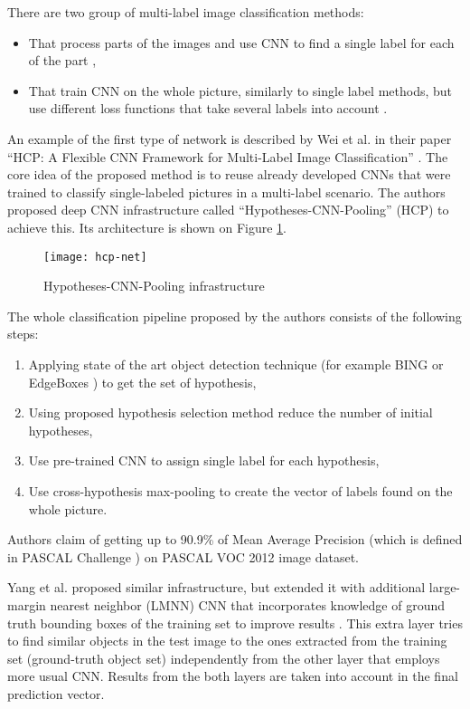 There are two group of multi-label image classification methods:
\begin{itemize}
    \item That process parts of the images and use CNN to find a single label for each of the part \cite{Wei2016HCP, Ren2016,  Yang2015},
    \item That train CNN on the whole picture, similarly to single label methods, but use different loss functions that take several labels into account \cite{Gong2013DeepRanking}.
\end{itemize}

An example of the first type of network is described by Wei et al. in their paper ``HCP: A Flexible CNN Framework for Multi-Label Image Classification''  \cite{Wei2016HCP}. The core idea of the proposed method is to reuse already developed CNNs that were trained to classify single-labeled pictures in a multi-label scenario. The authors proposed deep CNN infrastructure called ``Hypotheses-CNN-Pooling'' (HCP) to achieve this. Its architecture is shown on Figure \ref{fig:hcp-net}.

\begin{figure}[h!]
    \centering
    \texttt{[image: hcp-net]}
    \caption{Hypotheses-CNN-Pooling infrastructure \cite{Wei2016HCP}}
    \label{fig:hcp-net}
\end{figure}

The whole classification pipeline proposed by the authors consists of the following steps:
\begin{enumerate}
    \item Applying state of the art object detection technique (for example BING \cite{Cheng2014} or EdgeBoxes \cite{Zitnick2014}) to get the set of hypothesis,
    \item Using proposed hypothesis selection method reduce the number of initial hypotheses,
    \item Use pre-trained CNN to assign single label for each hypothesis,
    \item Use cross-hypothesis max-pooling to create the vector of labels found on the whole picture.
\end{enumerate}

Authors claim of getting up to 90.9\% of Mean Average Precision (which is defined in PASCAL Challenge \cite{Everingham2010PASCAL-VOC}) on PASCAL VOC 2012 image dataset.

Yang et al. proposed similar infrastructure, but extended it with additional large-margin nearest neighbor (LMNN) CNN that incorporates knowledge of ground truth bounding boxes of the training set to improve results  \cite{Yang2015}. This extra layer tries to find similar objects in the test image to the ones extracted from the training set (ground-truth object set) independently from the other layer that employs more usual CNN. Results from the both layers are taken into account in the final prediction vector.

